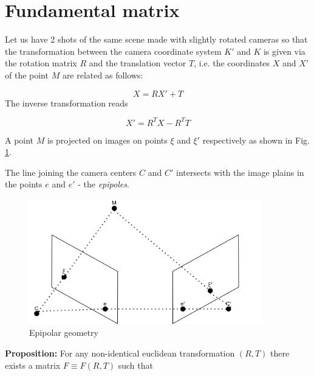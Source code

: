 \documentclass[a4paper,10pt]{article}
\title{}
\author{}
\begin{document}
\maketitle

\begin{abstract}

\end{abstract}

\section{Fundamental matrix}

Let us have 2 shots of the same scene made with slightly rotated cameras so that the transformation between the camera coordinate system $K'$ and $K$ is given via the rotation matrix $R$ and the translation vector $T$, i.e. the coordinates $X$ and $X'$ of the point $M$ are related as follows:

\begin{equation}
 X = RX'+T
\end{equation}
The inverse transformation reads

\begin{equation}
 X'=R^TX-R^TT
\end{equation}


A point $M$ is projected on images on points $\xi$ and $\xi'$ respectively as shown in Fig. \ref{fig:epipoles}.

The line joining the camera centers $C$ and $C'$ intersects with the image plains in the points $e$ and $e'$ - the {\it epipoles}.

\begin{figure}[h]
\centering
 \includegraphics[width=0.9\textwidth]{../../images/epipoles.png}
 \caption{Epipolar geometry }
 \label{fig:epipoles}
\end{figure}

{\bf Proposition:} For any non-identical euclidean transformation $(R, T)$ there exists a matrix $F\equiv F(R, T)$ such that 
\end{document}
